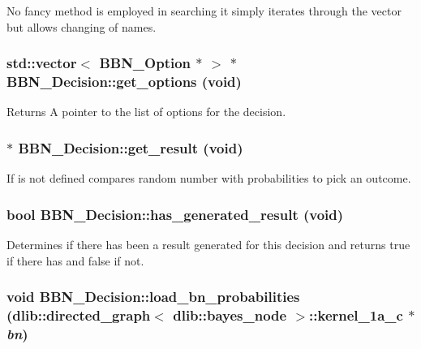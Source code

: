 No fancy method is employed in searching it simply iterates through the vector but allows changing of names. \hypertarget{classBBN__Decision_a66f57c1bf4d3efe58c30ea737835d67a}{
\subsubsection[{get\_\-options}]{\setlength{\rightskip}{0pt plus 5cm}std::vector$<$ {\bf BBN\_\-Option} $\ast$ $>$ $\ast$ BBN\_\-Decision::get\_\-options (void)}}
\label{classBBN__Decision_a66f57c1bf4d3efe58c30ea737835d67a}
\begin{DoxyReturn}{Returns}
A pointer to the list of options for the decision. 
\end{DoxyReturn}
\hypertarget{classBBN__Decision_aea433e9e244fdbd7c11135b738e0476b}{
\subsubsection[{get\_\-result}]{ $\ast$ BBN\_\-Decision::get\_\-result (void)}}
\label{classBBN__Decision_aea433e9e244fdbd7c11135b738e0476b}
If is not defined compares random number with probabilities to pick an outcome. \hypertarget{classBBN__Decision_a2e3f0320f1016c3e35c5730fa5c948e7}{
\subsubsection[{has\_\-generated\_\-result}]{\setlength{\rightskip}{0pt plus 5cm}bool BBN\_\-Decision::has\_\-generated\_\-result (void)}}
\label{classBBN__Decision_a2e3f0320f1016c3e35c5730fa5c948e7}
Determines if there has been a result generated for this decision and returns true if there has and false if not. \hypertarget{classBBN__Decision_a1a4ff92ffa1b4c3abba092b07d6f9b93}{
\subsubsection[{load\_\-bn\_\-probabilities}]{\setlength{\rightskip}{0pt plus 5cm}void BBN\_\-Decision::load\_\-bn\_\-probabilities (dlib::directed\_\-graph$<$ dlib::bayes\_\-node $>$::kernel\_\-1a\_\-c $\ast$ {\em bn})}}
